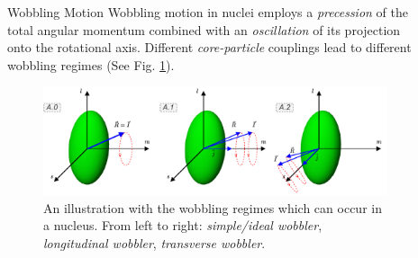 \documentclass[final]{beamer}
\newlength{\sepwidth}
\newlength{\colwidth}
\newcommand{\separatorcolumn}{\begin{column}{\sepwidth}\end{column}}
\begin{document}
\begin{frame}[t]
\begin{columns}[t]
\begin{column}{\colwidth}
\begin{block}{Wobbling Motion}
  Wobbling motion in nuclei employs a \emph{precession} of the total angular momentum combined with an \emph{oscillation} of its projection onto the rotational axis. Different \emph{core-particle} couplings lead to different wobbling regimes (See Fig. \ref{wobbling-regimes}).
  \begin{figure}
      \centering
      \includegraphics[scale=1.7]{images/wobbling_Regimes_COUPLING_SCHEME.pdf}
      \caption{An illustration with the wobbling regimes which can occur in a nucleus. From left to right: \emph{simple/ideal wobbler}, \emph{longitudinal wobbler}, \emph{transverse wobbler}.}
      \label{wobbling-regimes}
  \end{figure}
 
 
\end{block}
\end{column}

\separatorcolumn

\begin{column}{\colwidth}


\end{column}
\end{columns}
\end{frame}
\end{document}
